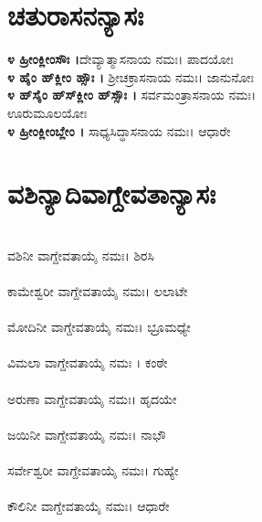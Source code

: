 \section{ಚತುರಾಸನನ್ಯಾಸಃ}
{\bfseries ೪ ಹ್ರೀಂಕ್ಲೀಂಸೌಃ ।}ದೇವ್ಯಾತ್ಮಾಸನಾಯ ನಮಃ। ಪಾದಯೋಃ\\
{\bfseries ೪ ಹೈಂ ಹ್‌ಕ್ಲೀಂ ಹ್ಸೌಃ ।} ಶ್ರೀಚಕ್ರಾಸನಾಯ ನಮಃ। ಜಾನುನೋಃ\\
{\bfseries ೪ ಹ್‌ಸೈಂ ಹ್‌ಸ್‌ಕ್ಲೀಂ ಹ್‌ಸ್ಸೌಃ ।} ಸರ್ವಮಂತ್ರಾಸನಾಯ ನಮಃ।\\ಊರುಮೂಲಯೋಃ\\
{\bfseries ೪ ಹ್ರೀಂಕ್ಲೀಂಬ್ಲೇಂ ।} ಸಾಧ್ಯಸಿದ್ಧಾಸನಾಯ ನಮಃ। ಆಧಾರೇ
\section{ವಶಿನ್ಯಾದಿವಾಗ್ದೇವತಾನ್ಯಾಸಃ}
\\ ವಶಿನೀ ವಾಗ್ದೇವತಾಯೈ ನಮಃ। ಶಿರಸಿ\\
\\ ಕಾಮೇಶ್ವರೀ ವಾಗ್ದೇವತಾಯೈ ನಮಃ। ಲಲಾಟೇ\\
\\ ಮೋದಿನೀ ವಾಗ್ದೇವತಾಯೈ ನಮಃ। ಭ್ರೂಮಧ್ಯೇ\\
\\ ವಿಮಲಾ ವಾಗ್ದೇವತಾಯೈ ನಮಃ । ಕಂಠೇ\\
\\ ಅರುಣಾ ವಾಗ್ದೇವತಾಯೈ ನಮಃ। ಹೃದಯೇ\\
\\ ಜಯಿನೀ ವಾಗ್ದೇವತಾಯೈ ನಮಃ। ನಾಭೌ\\
\\ ಸರ್ವೇಶ್ವರೀ ವಾಗ್ದೇವತಾಯೈ ನಮಃ। ಗುಹ್ಯೇ\\
\\ ಕೌಲಿನೀ ವಾಗ್ದೇವತಾಯೈ ನಮಃ। ಆಧಾರೇ
